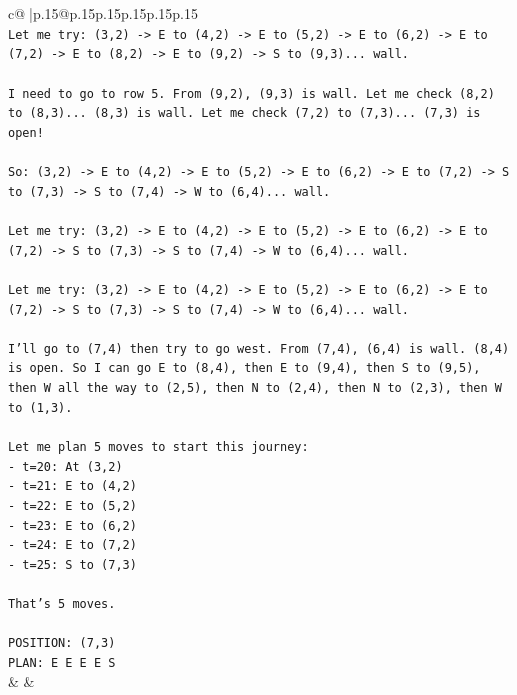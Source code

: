 \documentclass{article}
\begin{document}
{\begin{supertabular}{c@{$\;$}|p{.15\linewidth}@{}p{.15\linewidth}p{.15\linewidth}p{.15\linewidth}p{.15\linewidth}p{.15\linewidth}}
{{{\\ 
\texttt{Let me try: (3,2) {-}> E to (4,2) {-}> E to (5,2) {-}> E to (6,2) {-}> E to (7,2) {-}> E to (8,2) {-}> E to (9,2) {-}> S to (9,3)... wall.} \\
\\ 
\texttt{I need to go to row 5. From (9,2), (9,3) is wall. Let me check (8,2) to (8,3)... (8,3) is wall. Let me check (7,2) to (7,3)... (7,3) is open!} \\
\\ 
\texttt{So: (3,2) {-}> E to (4,2) {-}> E to (5,2) {-}> E to (6,2) {-}> E to (7,2) {-}> S to (7,3) {-}> S to (7,4) {-}> W to (6,4)... wall.} \\
\\ 
\texttt{Let me try: (3,2) {-}> E to (4,2) {-}> E to (5,2) {-}> E to (6,2) {-}> E to (7,2) {-}> S to (7,3) {-}> S to (7,4) {-}> W to (6,4)... wall.} \\
\\ 
\texttt{Let me try: (3,2) {-}> E to (4,2) {-}> E to (5,2) {-}> E to (6,2) {-}> E to (7,2) {-}> S to (7,3) {-}> S to (7,4) {-}> W to (6,4)... wall.} \\
\\ 
\texttt{I'll go to (7,4) then try to go west. From (7,4), (6,4) is wall. (8,4) is open. So I can go E to (8,4), then E to (9,4), then S to (9,5), then W all the way to (2,5), then N to (2,4), then N to (2,3), then W to (1,3).} \\
\\ 
\texttt{Let me plan 5 moves to start this journey:} \\
\texttt{{-} t=20: At (3,2)} \\
\texttt{{-} t=21: E to (4,2)} \\
\texttt{{-} t=22: E to (5,2)} \\
\texttt{{-} t=23: E to (6,2)} \\
\texttt{{-} t=24: E to (7,2)} \\
\texttt{{-} t=25: S to (7,3)} \\
\\ 
\texttt{That's 5 moves.} \\
\\ 
\texttt{POSITION: (7,3)} \\
\texttt{PLAN: E E E E S} \\
            }
        }
    }
    & & \\ \\


\end{supertabular}}
\end{document}
